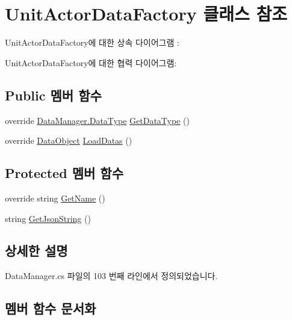 \hypertarget{class_unit_actor_data_factory}{}\section{Unit\+Actor\+Data\+Factory 클래스 참조}
\label{class_unit_actor_data_factory}


Unit\+Actor\+Data\+Factory에 대한 상속 다이어그램 \+: 


Unit\+Actor\+Data\+Factory에 대한 협력 다이어그램\+:
\subsection*{Public 멤버 함수}
\begin{DoxyCompactItemize}
\item 
override \hyperlink{class_data_manager_ac9cb5bf021d3ebcc7f3eaa4bf5393408}{Data\+Manager.\+Data\+Type} \hyperlink{class_unit_actor_data_factory_acf2e4d518f143721c03497ccd1d9a4b0}{Get\+Data\+Type} ()
\item 
override \hyperlink{class_data_object}{Data\+Object} \hyperlink{class_unit_actor_data_factory_af2d10cba13fca1669a50705e828cd475}{Load\+Datas} ()
\end{DoxyCompactItemize}
\subsection*{Protected 멤버 함수}
\begin{DoxyCompactItemize}
\item 
override string \hyperlink{class_unit_actor_data_factory_a28174650b3b068fd661b7c0adaea74d5}{Get\+Name} ()
\item 
string \hyperlink{class_data_factory_a5f040ba1715a670e29f45e07d22b4d5b}{Get\+Json\+String} ()
\end{DoxyCompactItemize}


\subsection{상세한 설명}


Data\+Manager.\+cs 파일의 103 번째 라인에서 정의되었습니다.



\subsection{멤버 함수 문서화}
